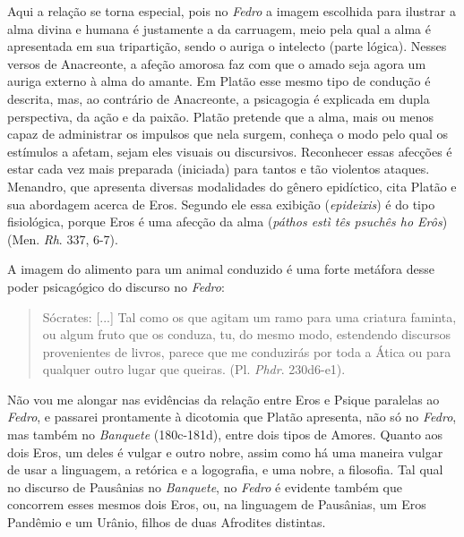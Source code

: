 Aqui a relação se torna especial, pois no \emph{Fedro} a imagem
escolhida para ilustrar a alma divina e humana é justamente a da
carruagem, meio pela qual a alma é apresentada em sua tripartição, sendo
o auriga o intelecto (parte lógica). Nesses versos de Anacreonte, a
afeção amorosa faz com que o amado seja agora um auriga externo à alma
do amante. Em Platão esse mesmo tipo de condução é descrita, mas, ao
contrário de Anacreonte, a psicagogia é explicada em dupla perspectiva,
da ação e da paixão. Platão pretende que a alma, mais ou menos capaz de
administrar os impulsos que nela surgem, conheça o modo pelo qual os
estímulos a afetam, sejam eles visuais ou discursivos. Reconhecer essas
afecções é estar cada vez mais preparada (iniciada) para tantos e tão
violentos ataques. Menandro, que apresenta diversas modalidades do
gênero epidíctico, cita Platão e sua abordagem acerca de Eros. Segundo
ele essa exibição (\emph{epideixis}) é do tipo fisiológica, porque Eros
é uma afecção da alma (\emph{páthos estì tês psuchês ho Erôs}) (Men.
\emph{Rh}. 337, 6-7).

A imagem do alimento para um animal conduzido é uma forte metáfora desse
poder psicagógico do discurso no \emph{Fedro}:

\begin{quote}
Sócrates: {[}...{]} Tal como os que agitam um ramo para uma criatura
faminta, ou algum fruto que os conduza, tu, do mesmo modo, estendendo
discursos provenientes de livros, parece que me conduzirás por toda a
Ática ou para qualquer outro lugar que queiras. (Pl. \emph{Phdr}.
230d6-e1).
\end{quote}

Não vou me alongar nas evidências da relação entre Eros e Psique
paralelas ao \emph{Fedro}, e passarei prontamente à dicotomia que Platão
apresenta, não só no \emph{Fedro}, mas também no \emph{Banquete}
(180c-181d), entre dois tipos de Amores. Quanto aos dois Eros, um deles
é vulgar e outro nobre, assim como há uma maneira vulgar de usar a
linguagem, a retórica e a logografia, e uma nobre, a filosofia. Tal qual
no discurso de Pausânias no \emph{Banquete}, no \emph{Fedro} é evidente
também que concorrem esses mesmos dois Eros, ou, na linguagem de
Pausânias, um Eros Pandêmio e um Urânio, filhos de duas Afrodites
distintas.

